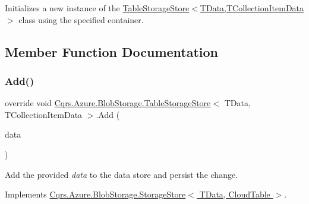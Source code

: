 Initializes a new instance of the \hyperlink{classCqrs_1_1Azure_1_1BlobStorage_1_1TableStorageStore_aabc36bc46ffb22b716cc7769a641cfab_aabc36bc46ffb22b716cc7769a641cfab}{Table\+Storage\+Store$<$\+T\+Data,\+T\+Collection\+Item\+Data$>$} class using the specified container. 



\subsection{Member Function Documentation}
\mbox{\label{classCqrs_1_1Azure_1_1BlobStorage_1_1TableStorageStore_ad9becfb4b149c645450deba342696e54_ad9becfb4b149c645450deba342696e54}} 
\subsubsection{\texorpdfstring{Add()}{Add()}\hspace{0.1cm}{\footnotesize\ttfamily [1/6]}}
{\footnotesize\ttfamily override void \hyperlink{classCqrs_1_1Azure_1_1BlobStorage_1_1TableStorageStore}{Cqrs.\+Azure.\+Blob\+Storage.\+Table\+Storage\+Store}$<$ T\+Data, T\+Collection\+Item\+Data $>$.Add (\begin{DoxyParamCaption}\item[{T\+Data}]{data }\end{DoxyParamCaption})\hspace{0.3cm}{\ttfamily [virtual]}}



Add the provided {\itshape data}  to the data store and persist the change. 



Implements \hyperlink{classCqrs_1_1Azure_1_1BlobStorage_1_1StorageStore_af56bdbd7fa6650aaef5c0bab9ed55f1a_af56bdbd7fa6650aaef5c0bab9ed55f1a}{Cqrs.\+Azure.\+Blob\+Storage.\+Storage\+Store$<$ T\+Data, Cloud\+Table $>$}.

\mbox{\label{classCqrs_1_1Azure_1_1BlobStorage_1_1TableStorageStore_aa8e6b41c32dd8f81d5ff852693e7979d_aa8e6b41c32dd8f81d5ff852693e7979d}} 
